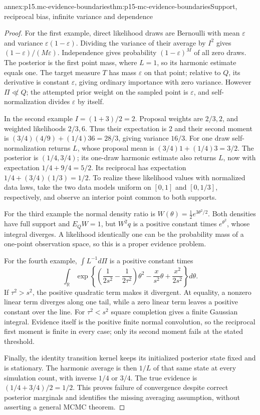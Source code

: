 \begin{annexitem}{annex:p15.mc-evidence-boundaries}{thm:p15-mc-evidence-boundaries}{Support, reciprocal bias, infinite variance and dependence}
\begin{proof}
For the first example, direct likelihood draws are Bernoulli with mean
\(\varepsilon\) and variance \(\varepsilon(1-\varepsilon)\).
Dividing the variance of their average by \(I^2\) gives
\((1-\varepsilon)/(M\varepsilon)\). Independence gives probability
\((1-\varepsilon)^M\) of all zero draws. The posterior is the first
point mass, where \(L=1\), so its harmonic estimate equals one.
The target measure \(T\) has mass \(\varepsilon\) on that point;
relative to \(Q\), its derivative is constant \(\varepsilon\), giving
ordinary importance with zero variance. However \(\Pi\not\ll Q\);
the attempted prior weight on the sampled point is \(\varepsilon\),
and self-normalization divides \(\varepsilon\) by itself.

In the second example \(I=(1+3)/2=2\). Proposal weights are \(2/3,2\),
and weighted likelihoods \(2/3,6\). Thus their expectation is 2 and
their second moment is
\((3/4)(4/9)+(1/4)36=28/3\), giving variance \(16/3\).
For one draw self-normalization returns \(L\), whose proposal mean is
\((3/4)1+(1/4)3=3/2\). The posterior is \((1/4,3/4)\);
its one-draw harmonic estimate also returns \(L\), now with expectation
\(1/4+9/4=5/2\). Its reciprocal has expectation
\(1/4+(3/4)(1/3)=1/2\).
To realize these likelihood values with normalized data laws, take the
two data models uniform on \([0,1]\) and \([0,1/3]\), respectively,
and observe an interior point common to both supports.

For the third example the normal density ratio is
\(W(\theta)=\tfrac12 e^{3\theta^2/2}\).
Both densities have full support and \(E_QW=1\), but \(W^2q\)
is a positive constant times \(e^{\theta^2}\), whose integral diverges.
A likelihood identically one can be the probability mass of a one-point
observation space, so this is a proper evidence problem.

For the fourth example, \(\int L^{-1}d\Pi\) is a positive constant times
\[
 \int_{\mathbb R}
 \exp\!\left\{\left(\frac1{2s^2}-\frac1{2\tau^2}\right)\theta^2
                       -\frac{x}{s^2}\theta+\frac{x^2}{2s^2}\right\}d\theta.
\]
If \(\tau^2>s^2\), the positive quadratic term makes it divergent.
At equality, a nonzero linear term diverges along one tail, while a zero
linear term leaves a positive constant over the line. For \(\tau^2<s^2\)
square completion gives a finite Gaussian integral. Evidence itself is
the positive finite normal convolution, so the reciprocal first moment
is finite in every case; only its second moment fails at the stated
threshold.

Finally, the identity transition kernel keeps its initialized posterior
state fixed and is stationary. The harmonic average is then \(1/L\) of
that same state at every simulation count, with inverse \(1/4\) or \(3/4\).
The true evidence is \((1/4+3/4)/2=1/2\). This proves failure of
convergence despite correct posterior marginals and identifies the missing
averaging assumption, without asserting a general MCMC theorem.
\end{proof}
\end{annexitem}
